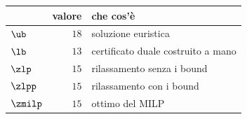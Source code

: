 \begin{center}\small
\begin{tabular}{lrl}
\toprule
 & valore & che cos'è \\
\midrule
$\ub$ & $18$ & soluzione euristica \\
$\lb$ & $13$ & certificato duale costruito a mano \\
$\zlp$ & $15$ & rilassamento senza i bound \\
$\zlpp$ & $15$ & rilassamento con i bound \\
$\zmilp$ & $15$ & ottimo del MILP \\
\bottomrule
\end{tabular}
\end{center}
